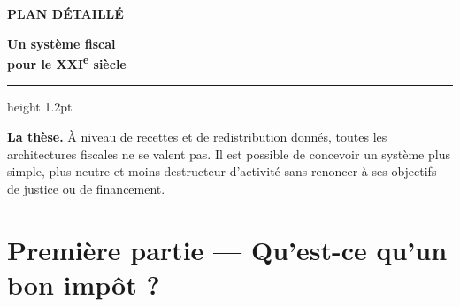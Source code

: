 \documentclass[11pt,a4paper]{article}
\begin{document}
\thispagestyle{empty}
{\footnotesize\color{ocre}\bfseries PLAN DÉTAILLÉ\par}
\vspace{5pt}
{\raggedright\fontsize{18}{21}\selectfont\bfseries Un système fiscal\\ pour le XXI\textsuperscript{e} siècle\par}
\vspace{6pt}
{\color{encre}\hrule height 1.2pt}
\vspace{9pt}

\textbf{La thèse.} À niveau de recettes et de redistribution donnés, toutes les architectures
fiscales ne se valent pas. Il est possible de concevoir un système plus simple, plus neutre et moins
destructeur d'activité sans renoncer à ses objectifs de justice ou de financement.

\section{Première partie --- Qu'est-ce qu'un bon impôt ?}
\end{document}

